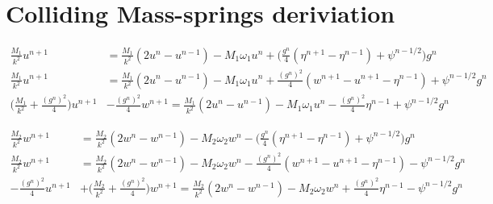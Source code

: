 \documentclass{article}
\begin{document}
\section{Colliding Mass-springs deriviation}\label{app:massMassDeriv}
\begin{align}
    \frac{M_1}{k^2}u^{n+1} &= \frac{M_1}{k^2}(2u^n-u^{n-1})-M_1\omega_1u^n+\Big(\frac{g^n}{4}(\eta^{n+1}-\eta^{n-1})+\psi^{n-1/2}\Big)g^n\nonumber\\
    \frac{M_1}{k^2}u^{n+1} &= \frac{M_1}{k^2}(2u^n-u^{n-1})-M_1\omega_1u^n+\frac{(g^n)^2}{4}(w^{n+1}-u^{n+1}-\eta^{n-1})+\psi^{n-1/2}g^n\nonumber\\
    \bigg(\frac{M_1}{k^2}+\frac{(g^n)^2}{4}\bigg)u^{n+1} &- \frac{(g^n)^2}{4}w^{n+1} = \frac{M_1}{k^2}(2u^n-u^{n-1})-M_1\omega_1u^n-\frac{(g^n)^2}{4}\eta^{n-1}+\psi^{n-1/2}g^n
\end{align}

\begin{align}
    \frac{M_2}{k^2}w^{n+1} &= \frac{M_2}{k^2}(2w^n-w^{n-1})-M_2\omega_2w^n-\Big(\frac{g^n}{4}(\eta^{n+1}-\eta^{n-1})+\psi^{n-1/2}\Big)g^n\nonumber\\
    \frac{M_2}{k^2}w^{n+1} &= \frac{M_2}{k^2}(2w^n-w^{n-1})-M_2\omega_2w^n-\frac{(g^n)^2}{4}(w^{n+1}-u^{n+1}-\eta^{n-1})-\psi^{n-1/2}g^n\nonumber\\
    - \frac{(g^n)^2}{4}u^{n+1} &+ \bigg(\frac{M_2}{k^2}+\frac{(g^n)^2}{4}\bigg)w^{n+1} = \frac{M_2}{k^2}(2w^n-w^{n-1})-M_2\omega_2w^n+\frac{(g^n)^2}{4}\eta^{n-1}-\psi^{n-1/2}g^n
\end{align}
\end{document}

